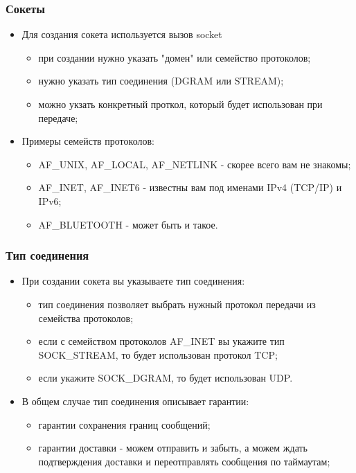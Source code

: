 \begin{frame}
\frametitle{Сокеты}

\begin{itemize}
  \item<1-> Для создания сокета используется вызов socket
    \begin{itemize}
      \item при создании нужно указать "домен" или семейство протоколов;
      \item нужно указать тип соединения (DGRAM или STREAM);
      \item можно укзать конкретный проткол, который будет использован при передаче;
    \end{itemize}
  \item<2->Примеры семейств протоколов:
    \begin{itemize}
      \item AF\_UNIX, AF\_LOCAL, AF\_NETLINK - скорее всего вам не знакомы;
      \item AF\_INET, AF\_INET6 - известны вам под именами IPv4 (TCP/IP) и IPv6;
      \item AF\_BLUETOOTH - может быть и такое.
    \end{itemize}
\end{itemize}
\end{frame}

\begin{frame}
\frametitle{Тип соединения}

\begin{itemize}
  \item<1-> При создании сокета вы указываете тип соединения:
    \begin{itemize}
      \item тип соединения позволяет выбрать нужный протокол передачи из семейства протоколов;
      \item если с семейством протоколов AF\_INET вы укажите тип SOCK\_STREAM, то будет использован протокол TCP;
      \item если укажите SOCK\_DGRAM, то будет использован UDP.
    \end{itemize}
  \item<2-> В общем случае тип соединения описывает гарантии:
    \begin{itemize}
      \item гарантии сохранения границ сообщений;
      \item гарантии доставки - можем отправить и забыть, а можем ждать подтверждения доставки и переотправлять сообщения по таймаутам;
    \end{itemize}
\end{itemize}
\end{frame}

